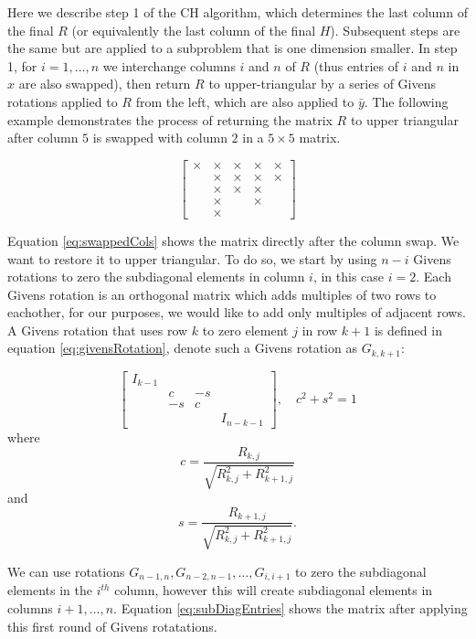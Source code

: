 \documentclass[12pt,Bold,letterpaper]{mcgilletdclass}
\begin{document}
Here we describe  step 1 of the CH algorithm, which determines the last column of the final $R$ 
(or equivalently the last column of the final $H$).
Subsequent steps are the same but are applied to a subproblem that is one dimension smaller. 
In step 1, for $i = 1,\dots,n$ we interchange
columns $i$ and $n$ of  $R$ (thus entries of $i$ and $n$ in $x$ are also swapped), then return $R$ to upper-triangular
by a series of Givens rotations applied to $R$ from the left, which  are also applied to $\bar{y}$. The following example demonstrates the process of returning the matrix $R$ to upper triangular after column $5$ is swapped with column $2$ in a $5 \times 5$ matrix.

\begin{equation} \label{eq:swappedCols}
\begin{bmatrix}
\times & \times & \times & \times & \times\\ 
  & \times & \times & \times & \times\\ 
  & \times & \times & \times &  \\ 
  & \times &  &  \times &  \\ 
  & \times &  &    & 
\end{bmatrix}
\end{equation}

Equation \ref{eq:swappedCols} shows the matrix directly after the column swap. We want to restore it to upper triangular. To do so, we start by using $n-i$ Givens rotations to zero the subdiagonal elements in column $i$, in this case $i = 2$. Each Givens rotation is an orthogonal matrix which adds multiples of two rows to eachother, for our purposes, we would like to add only multiples of adjacent rows. A Givens rotation that uses row $k$ to zero element $j$ in row $k+1$ is defined in equation \eqref{eq:givensRotation}, denote such a Givens rotation as $G_{k,k+1}$:

\begin{equation} \label{eq:givensRotation}
\begin{bmatrix}
I_{k-1} &  &  & \\ 
 & c & -s & \\ 
 & -s & c & \\ 
 &  &  & I_{n-k-1}
\end{bmatrix} ,\quad c^2+s^2=1
\end{equation}
where $$c=\frac{R_{k,j}}{\sqrt{R_{k,j}^2+R_{k+1,j}^2}}$$ and $$s=\frac{R_{k+1,j}}{\sqrt{R_{k,j}^2+R_{k+1,j}^2}}.$$

We can use rotations $G_{n-1,n}, G_{n-2,n-1}, \dots, G_{i,i+1}$ to zero the subdiagonal elements in the $i^{th}$ column, however this will create subdiagonal elements in columns $i+1, \dots, n$. Equation \eqref{eq:subDiagEntries} shows the matrix after applying this first round of Givens rotatations.
\end{document}
